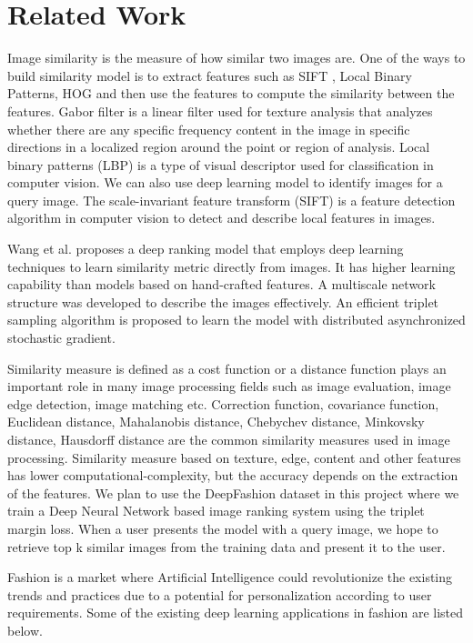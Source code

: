 \section{Related Work}
Image similarity is the measure of how similar two images are. One of the ways to build similarity model is to extract features such as SIFT \cite{van1999}, Local Binary Patterns, HOG \cite{dalal2005} and then use the features to compute the similarity between the features. Gabor filter is a linear filter used for texture analysis that analyzes whether there are any specific frequency content in the image in specific directions in a localized region around the point or region of analysis. Local binary patterns (LBP) is a type of visual descriptor used for classification in computer vision. We can also use deep learning model to identify images for a query image. The scale-invariant feature transform (SIFT) is a feature detection algorithm in computer vision to detect and describe local features in images. 

Wang et al.\cite{wang2014learning} proposes a deep ranking model that employs deep learning techniques to learn similarity metric directly from images. It has higher learning
capability than models based on hand-crafted features. A multiscale network structure was developed to describe the images effectively. An efficient triplet sampling algorithm is proposed to learn the model with distributed asynchronized stochastic gradient. 

Similarity measure is defined as a cost function or a distance function plays an important role in many image processing fields such as image evaluation, image edge detection, image matching etc. Correction function, covariance function, Euclidean distance, Mahalanobis distance, Chebychev distance, Minkovsky distance, Hausdorff distance are the common similarity measures used in image processing. Similarity measure based on texture, edge, content and other features has lower computational-complexity, but the accuracy depends on the extraction of the features. 
We plan to use the DeepFashion\cite{liu2016deepfashion} dataset in this project where we train a Deep Neural Network based image ranking system using the triplet margin loss. When a user presents the model with a query image, we hope to retrieve top k similar images from the training data and present it to the user.

Fashion is a market where Artificial Intelligence could revolutionize the existing trends and practices due to a potential for personalization according to user requirements. Some of the existing deep learning applications in fashion are listed below.


